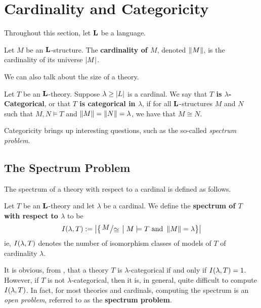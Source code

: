 \section{Cardinality and Categoricity}

Throughout this section, let $\mathbf{L}$ be a language.

\begin{boxdefinition}
    Let $M$ be an $\mathbf{L}$-structure. The \textbf{cardinality of $M$}, denoted $\left\lVert M \right\rVert$, is the cardinality of its universe $\left\lvert M \right\rvert$.
\end{boxdefinition}

We can also talk about the size of a theory.

\begin{boxdefinition}\label{Ch1:Def:Categoricity}
    Let $T$ be an $\mathbf{L}$-theory. Suppose $\lambda \geq \left\lvert L \right\rvert$ is a cardinal. We say that \textbf{$T$ is $\lambda$-Categorical}, or that \textbf{$T$ is categorical in $\lambda$}, if for all $\mathbf{L}$-structures $M$ and $N$ such that $M, N \models T$ and $\left\lVert M \right\rVert = \left\lVert N \right\rVert = \lambda$, we have that $M \cong N$.
\end{boxdefinition}

Categoricity brings up interesting questions, such as the so-called \textit{spectrum problem}.

\subsection{The Spectrum Problem}

The spectrum of a theory with respect to a cardinal is defined as follows.

\begin{boxdefinition}[Spectrum]\label{Ch1:Def:Spectrum}
    Let $T$ be an $\mathbf{L}$-theory and let $\lambda$ be a cardinal. We define the \textbf{spectrum of $T$ with respect to $\lambda$} to be
    \begin{align*}
        I\of{\lambda, T} := \abs{
            \setst{\quotient{M}{\cong}}{M \models T \text{ and } \norm{M} = \lambda}
        }
    \end{align*}
    ie, $I\!\left( \lambda, T \right)$ denotes the number of isomorphism classes of models of $T$ of cardinality $\lambda$.
\end{boxdefinition}

It is obvious, from , that a theory $T$ is $\lambda$-categorical if and only if $I\!\left( \lambda, T \right) = 1$. However, if $T$ is not $\lambda$-categorical, then it is, in general, quite difficult to compute $I\!\left( \lambda, T \right)$. In fact, for most theories and cardinals, computing the spectrum is an \textit{open problem}, referred to as the \textbf{spectrum problem}.

